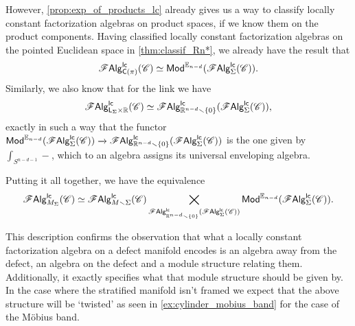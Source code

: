 \documentclass[../text]{subfiles}
\begin{document}
However, \cref{prop:exp_of_products_lc} already gives us a way to classify locally constant factorization algebras on product spaces, if we know them on the product components. Having classified locally constant factorization algebras on the pointed Euclidean space in \cref{thm:classif_Rn*}, we already have the result that
%
\begin{equation}
    \lcfa_{\cone(\pi)} (\catC) \simeq \mathsf{Mod}^{\mathbb{E}_{n-d}} (\lcfa_{\Sigma} (\catC)).
\end{equation}
%
Similarly, we also know that for the link we have
%
%
\begin{equation}
    \mathscr{F} \mathsf{Alg}^{\mathsf{lc}}_{\mathsf{L}_{\Sigma} \times \mathbb{R}} (\mathscr{C}) \simeq \mathscr{F} \mathsf{Alg}^{\mathsf{lc}}_{\mathbb{R}^{n-d} \smallsetminus \{ 0\} } (\mathscr{F} \mathsf{Alg}^{\mathsf{lc}}_{\Sigma} (\mathscr{C})),
\end{equation}
%
exactly in such a way that the functor $\mathsf{Mod}^{\mathbb{E}_{n-d}} (\mathscr{F} \mathsf{Alg}^{\mathsf{lc}}_{\Sigma} (\mathscr{C})) \xrightarrow{} \mathscr{F} \mathsf{Alg}^{\mathsf{lc}}_{\mathbb{R}^{n-d} \smallsetminus \{ 0\} } (\mathscr{F} \mathsf{Alg}^{\mathsf{lc}}_{\Sigma} (\mathscr{C}))$ is the one given by $\int_{S^{n-d-1}} -$, which to an algebra assigns its universal enveloping algebra.

Putting it all together, we have the equivalence
%
\begin{equation}
    \mathscr{F} \mathsf{Alg}^{\mathsf{lc}}_{M_\Sigma} (\mathscr{C}) \simeq \mathscr{F} \mathsf{Alg}^{\mathsf{lc}}_{M \smallsetminus \Sigma} (\mathscr{C}) \bigtimes_{\mathscr{F} \mathsf{Alg}^{\mathsf{lc}}_{\mathbb{R}^{n-d} \smallsetminus \{0\}} (\mathscr{F} \mathsf{Alg}^{\mathsf{lc}}_{\Sigma} (\mathscr{C}))} \mathsf{Mod}^{\mathbb{E}_{n-d}} (\mathscr{F} \mathsf{Alg}^{\mathsf{lc}}_{\Sigma} (\mathscr{C})).
\end{equation}

This description confirms the observation that what a locally constant factorization algebra on a defect manifold encodes is an algebra away from the defect, an algebra on the defect and a module structure relating them. Additionally, it exactly specifies what that module structure should be given by. In the case where the stratified manifold isn't framed we expect that the above structure will be `twisted' as seen in \cref{ex:cylinder_mobius_band} for the case of the M\"obius band.
\end{document}

